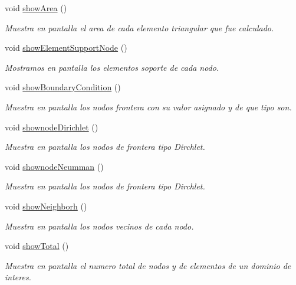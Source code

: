 \begin{DoxyCompactItemize}
void \hyperlink{class_mesh_a759b0e82f01de4d168b2a30e5280df3c}{show\+Area} ()
\begin{DoxyCompactList}\small\item\em Muestra en pantalla el area de cada elemento triangular que fue calculado. \end{DoxyCompactList}\item 
void \hyperlink{class_mesh_a895299dd6c9c2e2ffb5ef59becc81fd3}{show\+Element\+Support\+Node} ()
\begin{DoxyCompactList}\small\item\em Mostramos en pantalla los elementos soporte de cada nodo. \end{DoxyCompactList}\item 
void \hyperlink{class_mesh_a45a42ffc6565851e50e47b6b618c22f5}{show\+Boundary\+Condition} ()
\begin{DoxyCompactList}\small\item\em Muestra en pantalla los nodos frontera con su valor asignado y de que tipo son. \end{DoxyCompactList}\item 
void \hyperlink{class_mesh_a01bf98587a47624696aa808efac92ad8}{shownode\+Dirichlet} ()
\begin{DoxyCompactList}\small\item\em Muestra en pantalla los nodos de frontera tipo Dirchlet. \end{DoxyCompactList}\item 
void \hyperlink{class_mesh_a0a4f5148e80cc4a1df6db20e149515a2}{shownode\+Neumman} ()
\begin{DoxyCompactList}\small\item\em Muestra en pantalla los nodos de frontera tipo Dirchlet. \end{DoxyCompactList}\item 
void \hyperlink{class_mesh_aeca4f92ea58c7c4f87e33df91ac33574}{show\+Neighborh} ()
\begin{DoxyCompactList}\small\item\em Muestra en pantalla los nodos vecinos de cada nodo. \end{DoxyCompactList}\item 
void \hyperlink{class_mesh_a941977c20a68f58aa11d264fb30f3032}{show\+Total} ()
\begin{DoxyCompactList}\small\item\em Muestra en pantalla el numero total de nodos y de elementos de un dominio de interes. \end{DoxyCompactList}\end{DoxyCompactItemize}


